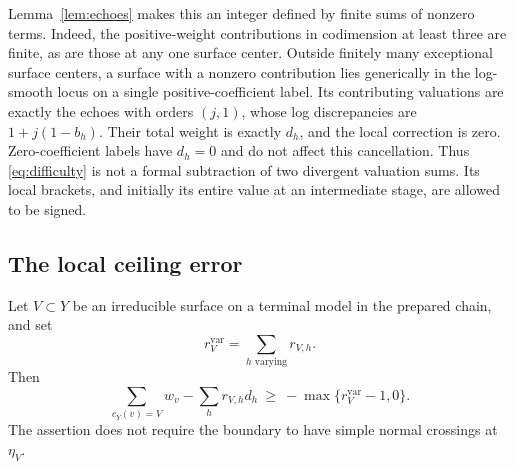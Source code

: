 Lemma~\ref{lem:echoes} makes this an integer defined by finite sums
of nonzero terms.  Indeed, the positive-weight contributions in
codimension at least three are finite, as are those at any one
surface center.  Outside finitely many exceptional surface centers,
a surface with a nonzero contribution lies generically in the
log-smooth locus on a single positive-coefficient label.  Its
contributing valuations are exactly the echoes with orders
\((j,1)\), whose log discrepancies are
\(1+j(1-b_h)\).  Their total weight is exactly \(d_h\), and the
local correction is zero.  Zero-coefficient labels have
\(d_h=0\) and do not affect this cancellation.  Thus
\eqref{eq:difficulty} is not a formal subtraction of two divergent
valuation sums.  Its local brackets, and initially its entire value
at an intermediate stage, are allowed to be signed.

\subsection{The local ceiling error}

\begin{lemma}
\label{lem:ceiling-error}
Let \(V\subset Y\) be an irreducible surface on a terminal model in
the prepared chain, and set
\[
 r_V^{\mathrm{var}}=\sum_{h\text{ varying}}r_{V,h}.
\]
Then
\begin{equation}
\label{eq:local-ceiling-bound}
 \sum_{c_Y(v)=V}w_v-\sum_h r_{V,h}d_h
 \ \geq\ -\max\{r_V^{\mathrm{var}}-1,0\}.
\end{equation}
The assertion does not require the boundary to have simple normal
crossings at \(\eta_V\).
\end{lemma}


